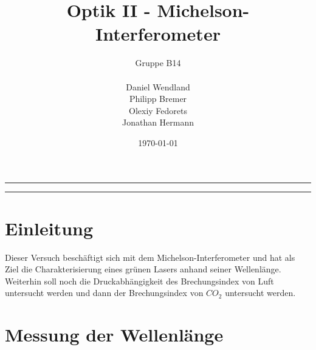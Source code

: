 \documentclass[a4paper, 11pt]{article}
\title{Optik II - Michelson-Interferometer}
\author{Gruppe B14 \\ \\ Daniel Wendland \\ Philipp Bremer \\ Olexiy Fedorets \\ Jonathan Hermann}
\date{\today}
\begin{document}
\begin{titlepage}
	\vspace*{\fill}
	\begin{center}
		\textheight
		\vfill
		\newcommand{\Line}{\rule{\linewidth}{0.6mm}}
		\Line 
		{\let\newpage\relax\maketitle}
		\Line 
		\vfill
	\end{center}

	
	\vspace*{\fill}
	\thispagestyle{empty}
\end{titlepage}





\newpage
\thispagestyle{empty}
\tableofcontents
\newpage

\pagestyle{fancy}
\fancyhf{}
\fancyhead[L]{\nouppercase{\leftmark}}
\fancyhead[R]{\thepage}
\renewcommand{\headrulewidth}{0.5pt}
\fancyfoot[C]{\thepage}


\setcounter{page}{1}

\section{Einleitung}
Dieser Versuch beschäftigt sich mit dem Michelson-Interferometer und hat als Ziel die Charakterisierung eines grünen Lasers anhand seiner Wellenlänge. Weiterhin soll noch die Druckabhängigkeit des Brechungsindex von Luft untersucht werden und dann der  Brechungsindex von $CO_2$ untersucht werden.

\section{Messung der Wellenlänge}
\end{document}
